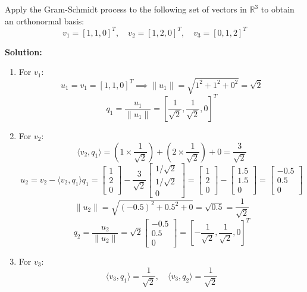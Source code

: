 \documentclass[12pt,a4paper]{article}
\begin{document}
\begin{tcolorbox}[examplebox, title={Example: Gram-Schmidt Orthonormalization}]
Apply the Gram-Schmidt process to the following set of vectors in $\mathbb{R}^3$ to obtain an orthonormal basis:
\[
  v_1 = [1, 1, 0]^T, \quad v_2 = [1, 2, 0]^T, \quad v_3 = [0, 1, 2]^T
\]

\textbf{Solution:}
\begin{enumerate}[label=\textbf{\arabic*.}, leftmargin=*, itemsep=4pt]
  \item For $v_1$:
    \[
      u_1 = v_1 = [1, 1, 0]^T \implies \|u_1\| = \sqrt{1^2 + 1^2 + 0^2} = \sqrt{2}
    \]
    \[
      q_1 = \frac{u_1}{\|u_1\|} = \left[\frac{1}{\sqrt{2}}, \frac{1}{\sqrt{2}}, 0\right]^T
    \]
  \item For $v_2$:
    \[
      \langle v_2, q_1 \rangle = (1 \times \frac{1}{\sqrt{2}}) + (2 \times \frac{1}{\sqrt{2}}) + 0 = \frac{3}{\sqrt{2}}
    \]
    \[
      u_2 = v_2 - \langle v_2, q_1 \rangle q_1 = \begin{bmatrix} 1 \\ 2 \\ 0 \end{bmatrix} - \frac{3}{\sqrt{2}}\begin{bmatrix} 1/\sqrt{2} \\ 1/\sqrt{2} \\ 0 \end{bmatrix} = \begin{bmatrix} 1 \\ 2 \\ 0 \end{bmatrix} - \begin{bmatrix} 1.5 \\ 1.5 \\ 0 \end{bmatrix} = \begin{bmatrix} -0.5 \\ 0.5 \\ 0 \end{bmatrix}
    \]
    \[
      \|u_2\| = \sqrt{(-0.5)^2 + 0.5^2 + 0} = \sqrt{0.5} = \frac{1}{\sqrt{2}}
    \]
    \[
      q_2 = \frac{u_2}{\|u_2\|} = \sqrt{2} \begin{bmatrix} -0.5 \\ 0.5 \\ 0 \end{bmatrix} = \left[-\frac{1}{\sqrt{2}}, \frac{1}{\sqrt{2}}, 0\right]^T
    \]
  \item For $v_3$:
    \[
      \langle v_3, q_1 \rangle = \frac{1}{\sqrt{2}}, \quad \langle v_3, q_2 \rangle = \frac{1}{\sqrt{2}}
\]
\end{enumerate}
\end{tcolorbox}
\end{document}
